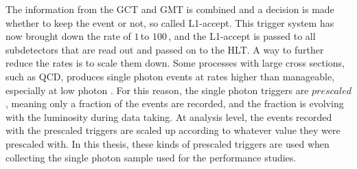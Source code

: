 The information from the GCT and GMT is combined and a decision is made whether to keep the event or not, so called L1-accept. 
This trigger system has now brought down the rate of $1\,$\GHz to $100\,$\kHz, and the L1-accept is passed to all subdetectors that are read out and passed on to the HLT.
\newpara
\noindent\justify
A way to further reduce the rates is to scale them down. 
Some processes with large cross sections, such as QCD, produces single photon events at rates higher than manageable, especially at low photon \pt. 
For this reason, the single photon triggers are $prescaled$, meaning only a fraction of the events are recorded, and the fraction is evolving with the luminosity during data taking. 
At analysis level, the events recorded with the prescaled triggers are scaled up according to whatever value they were prescaled with. 
In this thesis, these kinds of prescaled triggers are used when collecting the single photon sample used for the \ptmiss performance studies.  
